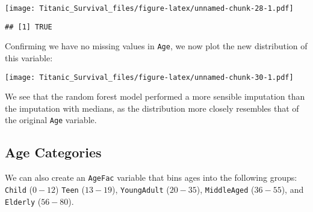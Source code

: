 \documentclass[]{article}
\newenvironment{Shaded}{\begin{snugshade}}{\end{snugshade}}
\newcommand{\KeywordTok}[1]{\textcolor[rgb]{0.13,0.29,0.53}{\textbf{#1}}}
\newcommand{\DataTypeTok}[1]{\textcolor[rgb]{0.13,0.29,0.53}{#1}}
\newcommand{\DecValTok}[1]{\textcolor[rgb]{0.00,0.00,0.81}{#1}}
\newcommand{\StringTok}[1]{\textcolor[rgb]{0.31,0.60,0.02}{#1}}
\newcommand{\CommentTok}[1]{\textcolor[rgb]{0.56,0.35,0.01}{\textit{#1}}}
\newcommand{\OperatorTok}[1]{\textcolor[rgb]{0.81,0.36,0.00}{\textbf{#1}}}
\newcommand{\NormalTok}[1]{#1}
\begin{document}
\texttt{[image: Titanic\_Survival\_files/figure-latex/unnamed-chunk-28-1.pdf]}

\begin{Shaded}
\end{Shaded}

\begin{verbatim}
## [1] TRUE
\end{verbatim}

Confirming we have no missing values in \texttt{Age}, we now plot the
new distribution of this variable:

\texttt{[image: Titanic\_Survival\_files/figure-latex/unnamed-chunk-30-1.pdf]}

We see that the random forest model performed a more sensible imputation
than the imputation with medians, as the distribution more closely
resembles that of the original \texttt{Age} variable.

\subsection{Age Categories}\label{age-categories}

We can also create an \texttt{AgeFac} variable that bins ages into the
following groups: \texttt{Child} (\(0-12\)) \texttt{Teen} (\(13-19\)),
\texttt{YoungAdult} (\(20-35\)), \texttt{MiddleAged} (\(36-55\)), and
\texttt{Elderly} (\(56-80\)).
\end{document}
